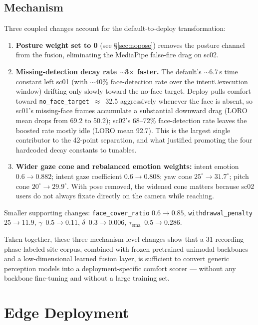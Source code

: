 \documentclass{article}
\newcommand{\code}[1]{\texttt{\small #1}}
\begin{document}
\subsection{Mechanism}\label{sec:mechanism}

Three coupled changes account for the default-to-deploy transformation:
\begin{enumerate}
  \item \textbf{Posture weight set to 0} (see \S\ref{sec:nopose}) removes the posture channel from the fusion, eliminating the MediaPipe false-fire drag on sc02.
  \item \textbf{Missing-detection decay rate $\sim$3$\times$ faster.} The default's $\sim$6.7\,s time constant left sc01 (with $\sim$40\% face-detection rate over the intent$\cup$execution window) drifting only slowly toward the no-face target. Deploy pulls comfort toward \code{no\_face\_target}~$\approx$~32.5 aggressively whenever the face is absent, so sc01's missing-face frames accumulate a substantial downward drag (LORO mean drops from 69.2 to 50.2); sc02's 68--72\% face-detection rate leaves the boosted rate mostly idle (LORO mean 92.7). This is the largest single contributor to the 42-point separation, and what justified promoting the four hardcoded decay constants to tunables.
  \item \textbf{Wider gaze cone and rebalanced emotion weights:} intent emotion $0.6 \to 0.882$; intent gaze coefficient $0.6 \to 0.808$; yaw cone $25^\circ \to 31.7^\circ$; pitch cone $20^\circ \to 29.9^\circ$. With pose removed, the widened cone matters because sc02 users do not always fixate directly on the camera while reaching.
\end{enumerate}

Smaller supporting changes: \code{face\_cover\_ratio} $0.6 \to 0.85$, \code{withdrawal\_penalty} $25 \to 11.9$, $\gamma$~$0.5 \to 0.11$, $\delta$~$0.3 \to 0.006$, $\tau_\text{ema}$~$0.5 \to 0.286$.

Taken together, these three mechanism-level changes show that a 31-recording phase-labeled site corpus, combined with frozen pretrained unimodal backbones and a low-dimensional learned fusion layer, is sufficient to convert generic perception models into a deployment-specific comfort scorer --- without any backbone fine-tuning and without a large training set.

\section{Edge Deployment}\label{sec:distill}
\end{document}
